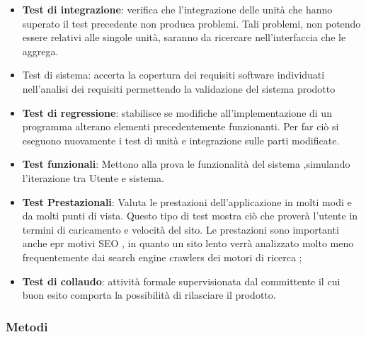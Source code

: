 \begin{itemize}
\begin{itemize}
\item \textbf{Test di integrazione}:
verifica che l'integrazione delle unità che hanno superato il test precedente non produca problemi. Tali problemi, non potendo essere relativi alle singole unità, saranno da ricercare nell'interfaccia che le aggrega.
\item Test di sistema:
accerta la copertura dei requisiti software individuati nell'analisi dei requisiti permettendo la validazione del sistema prodotto

\item \textbf{Test di regressione}:
stabilisce se modifiche all'implementazione di un programma alterano elementi precedentemente funzionanti. Per far ciò si eseguono nuovamente i test di unità e integrazione sulle parti modificate.

\item \textbf{Test funzionali}:
Mettono alla prova le funzionalità del sistema ,simulando l'iterazione tra Utente e sistema.

\item \textbf{Test Prestazionali}:
Valuta le prestazioni dell'applicazione in molti modi e da molti punti di vista. Questo tipo di test mostra ciò che proverà l'utente in termini di caricamento e velocità del sito. Le prestazioni sono importanti anche epr motivi SEO , in quanto un sito lento verrà analizzato molto meno frequentemente dai search engine crawlers dei motori di ricerca ;

\item \textbf{Test di collaudo}:
attività formale supervisionata dal committente il cui buon esito comporta la possibilità di rilasciare il prodotto.
\end{itemize}
\end{itemize}
\subsubsection{Metodi}

